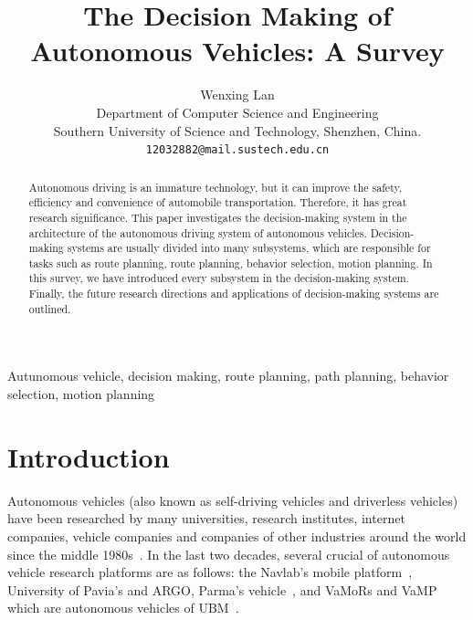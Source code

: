 \documentclass[conference]{IEEEtran}
\begin{document}
\title{The Decision Making of Autonomous Vehicles: A Survey}

\author{Wenxing Lan\\
	Department of Computer Science and Engineering\\
	Southern University of Science and Technology, Shenzhen, China.\\
	{\tt\small 12032882@mail.sustech.edu.cn}

}

\maketitle

\begin{abstract}
	Autonomous driving is an immature technology, but it can improve the safety, efficiency and convenience of automobile transportation. Therefore, it has great research significance. This paper investigates the decision-making system in the architecture of the autonomous driving system of autonomous vehicles. Decision-making systems are usually divided into many subsystems, which are responsible for tasks such as route planning, route planning, behavior selection, motion planning. In this survey, we have introduced every subsystem in the decision-making system. Finally, the future research directions and applications of decision-making systems are outlined.
\end{abstract}

\begin{IEEEkeywords}
Autunomous vehicle, decision making, route planning, path planning, behavior selection, motion planning
\end{IEEEkeywords}

\section{Introduction}
Autonomous vehicles (also known as self-driving vehicles and driverless vehicles) have been researched by many universities, research institutes, internet companies, vehicle companies and companies of other industries around the world since the middle 1980s~\cite{self_driving}. In the last two decades, several crucial of autonomous vehicle research platforms are as follows: the Navlab's mobile platform~\cite{Thorpe199144}, University of Pavia's and ARGO, Parma's vehicle~\cite{Broggi199955}, and VaMoRs and VaMP which are autonomous vehicles of UBM~\cite{Gregor200248}.
\end{document}
